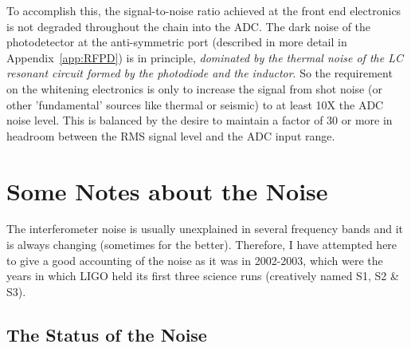 To accomplish this, the signal-to-noise ratio achieved at the front end
electronics is not degraded throughout the chain into the ADC. The 
dark noise of the photodetector at the anti-symmetric port (described in 
more detail in Appendix~\ref{app:RFPD}) is in principle, \emph{dominated by the 
thermal noise of the LC resonant circuit formed by the photodiode and the inductor}.
So the requirement on the whitening electronics is only to increase the
signal from shot noise (or other 'fundamental' sources like thermal or seismic)
to at least 10X the ADC noise level. This is balanced by the desire to maintain 
a factor of 30 or more in headroom between the RMS signal level and the ADC input range.



\section{Some Notes about the Noise}

The interferometer noise is usually unexplained in several frequency bands and 
it is always changing (sometimes for the better). Therefore,
I have attempted here to give a good accounting of the noise as it was in
2002-2003, which were the years in which LIGO held its first three science runs
(creatively named S1, S2 \& S3).

\subsection{The Status of the Noise}

